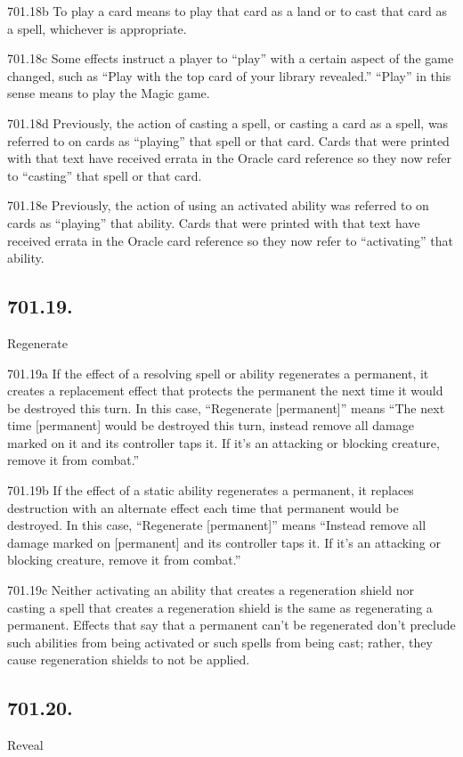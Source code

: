 701.18b To play a card means to play that card as a land or to cast that card as a spell, whichever is appropriate.

701.18c Some effects instruct a player to “play” with a certain aspect of the game changed, such as “Play with the top card of your library revealed.” “Play” in this sense means to play the Magic game.

701.18d Previously, the action of casting a spell, or casting a card as a spell, was referred to on cards as “playing” that spell or that card. Cards that were printed with that text have received errata in the Oracle card reference so they now refer to “casting” that spell or that card.

701.18e Previously, the action of using an activated ability was referred to on cards as “playing” that ability. Cards that were printed with that text have received errata in the Oracle card reference so they now refer to “activating” that ability.

\subsection*{701.19.}
Regenerate

701.19a If the effect of a resolving spell or ability regenerates a permanent, it creates a replacement effect that protects the permanent the next time it would be destroyed this turn. In this case, “Regenerate [permanent]” means “The next time [permanent] would be destroyed this turn, instead remove all damage marked on it and its controller taps it. If it’s an attacking or blocking creature, remove it from combat.”

701.19b If the effect of a static ability regenerates a permanent, it replaces destruction with an alternate effect each time that permanent would be destroyed. In this case, “Regenerate [permanent]” means “Instead remove all damage marked on [permanent] and its controller taps it. If it’s an attacking or blocking creature, remove it from combat.”

701.19c Neither activating an ability that creates a regeneration shield nor casting a spell that creates a regeneration shield is the same as regenerating a permanent. Effects that say that a permanent can’t be regenerated don’t preclude such abilities from being activated or such spells from being cast; rather, they cause regeneration shields to not be applied.

\subsection*{701.20.}
Reveal

